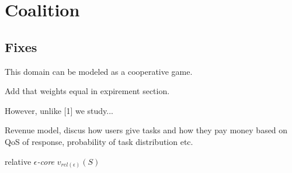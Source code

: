 \documentclass{article}
\begin{document}
\section{Coalition}

\subsection{Fixes}

This domain can be modeled as a cooperative game.

Add that weights equal in expirement section.

However, unlike [1] we study...

Revenue model, discus how users give tasks and how they pay money based on QoS of response, probability of task distribution etc.

relative \emph{$\epsilon$-core} $v_{rel(\epsilon)}(S)$



%
%
\end{document}
